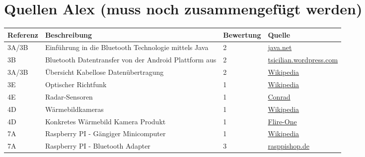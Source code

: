 \section{Quellen Alex (muss noch zusammengefügt werden)}

\begin{table}[h!]
	\centering
	\begin{tabular}{l l l l}
		Referenz & Beschreibung & Bewertung & Quelle \\
		\hline
        
        3A/3B & Einführung in die Bluetooth Technologie mittels Java & 2 & \href{https://today.java.net/pub/a/today/2004/07/27/bluetooth.html}{java.net} \\
        
        3B & Bluetooth Datentransfer von der Android Plattform aus & 2 & \href{http://tsicilian.wordpress.com/2012/11/06/bluetooth-data-transfer-with-android/}{tsicilian.wordpress.com} \\
        
        3A/3B & Übersicht Kabellose Datenübertragung & 2 & \href{http://de.wikipedia.org/w/index.php?title=Kabellose_\%C3\%9Cbertragungsverfahren&redirect=no}{Wikipedia} \\
        
        3E & Optischer Richtfunk & 1 & \href{http://de.wikipedia.org/wiki/Optischer_Richtfunk}{Wikipedia} \\
        
        4E & Radar-Sensoren & 1 & \href{http://www.conrad.ch/ce/de/overview/0231510/Radar-Sensoren}{Conrad} \\
        
        4D & Wärmebildkameras & 1 & \href{http://de.wikipedia.org/wiki/W\%C3\%A4rmebildkamera}{Wikipedia} \\
        
        4D & Konkretes Wärmebild Kamera Produkt & 1 & \href{http://www.mobilefun.co.uk/flir-one-personal-thermal-imaging-case-for-iphone-5-5s-p43472.htm}{Flire-One} \\
        
        7A & Raspberry PI - Gängiger Minicomputer & 1 & \href{http://de.wikipedia.org/wiki/Raspberry_Pi}{Wikipedia} \\
        
        7A & Raspberry PI - Bluetooth Adapter & 3 & \href{http://www.rasppishop.de/raspberry-pi-welt/netzwerk/w-lan/149/bluetooth-dongle-v2.0-adapter-fuer-raspberry-pi}{rasppishop.de} \\
        

\end{tabular}
\end{table}
